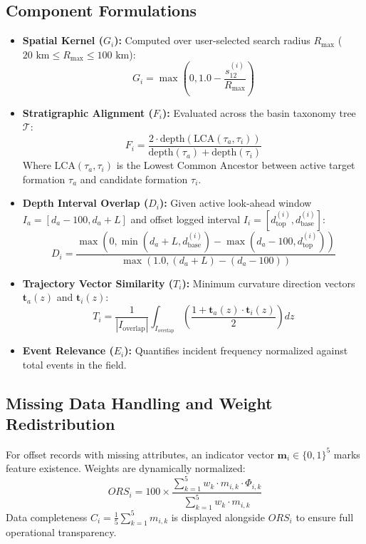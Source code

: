\documentclass[11pt,a4paper]{article}
\begin{document}
\subsection{Component Formulations}
\begin{itemize}
    \item \textbf{Spatial Kernel ($G_i$):} Computed over user-selected search radius $R_{\max}$ ($20\text{ km} \le R_{\max} \le 100\text{ km}$):
    \begin{equation}
    G_i = \max\left(0, 1.0 - \frac{s_{12}^{(i)}}{R_{\max}}\right)
    \end{equation}

    \item \textbf{Stratigraphic Alignment ($F_i$):} Evaluated across the basin taxonomy tree $\mathcal{T}$:
    \begin{equation}
    F_i = \frac{2 \cdot \text{depth}(\text{LCA}(\tau_a, \tau_i))}{\text{depth}(\tau_a) + \text{depth}(\tau_i)}
    \end{equation}
    Where $\text{LCA}(\tau_a, \tau_i)$ is the Lowest Common Ancestor between active target formation $\tau_a$ and candidate formation $\tau_i$.

    \item \textbf{Depth Interval Overlap ($D_i$):} Given active look-ahead window $I_a = [d_a - 100, d_a + L]$ and offset logged interval $I_i = [d_{\text{top}}^{(i)}, d_{\text{base}}^{(i)}]$:
    \begin{equation}
    D_i = \frac{\max\left(0, \min(d_a + L, d_{\text{base}}^{(i)}) - \max(d_a - 100, d_{\text{top}}^{(i)})\right)}{\max\left(1.0, (d_a + L) - (d_a - 100)\right)}
    \end{equation}

    \item \textbf{Trajectory Vector Similarity ($T_i$):} Minimum curvature direction vectors $\mathbf{t}_a(z)$ and $\mathbf{t}_i(z)$:
    \begin{equation}
    T_i = \frac{1}{|I_{\text{overlap}}|} \int_{I_{\text{overlap}}} \left( \frac{1 + \mathbf{t}_a(z) \cdot \mathbf{t}_i(z)}{2} \right) dz
    \end{equation}

    \item \textbf{Event Relevance ($E_i$):} Quantifies incident frequency normalized against total events in the field.
\end{itemize}

\subsection{Missing Data Handling and Weight Redistribution}
For offset records with missing attributes, an indicator vector $\mathbf{m}_i \in \{0, 1\}^5$ marks feature existence. Weights are dynamically normalized:
\begin{equation}
ORS_i = 100 \times \frac{\sum_{k=1}^5 w_k \cdot m_{i, k} \cdot \Phi_{i, k}}{\sum_{k=1}^5 w_k \cdot m_{i, k}}
\end{equation}
Data completeness $C_i = \frac{1}{5} \sum_{k=1}^5 m_{i, k}$ is displayed alongside $ORS_i$ to ensure full operational transparency.
\end{document}
